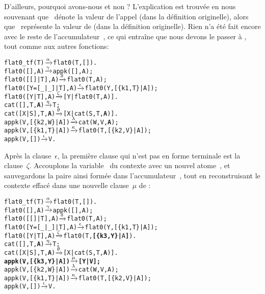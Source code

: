 D'ailleurs, pourquoi avons-nous  et non
?  L'explication est trouvée en nous souvenant que
~dénote la valeur de l'appel  (dans la
définition originelle), alors que ~représente la valeur de
 (dans la définition originelle). Rien n'a été fait
encore avec le reste de l'accumulateur~, ce qui entraîne
que nous devons le passer à , tout comme aux autres
fonctions:
\begin{alltt}
flat0\_tf(T)          \(\smashedrightarrow{\alpha}\) flat0(T,[]).
flat0(         [],A) \(\smashedrightarrow{\gamma}\) appk([],A);
flat0(     [[]|T],A) \(\smashedrightarrow{\delta}\) flat0(T,A);
flat0([Y=[\_|\_]|T],A) \(\smashedrightarrow{\epsilon}\) flat0(Y,[\{k1,T\}|A]);
flat0(      [Y|T],A) \(\smashedrightarrow{\zeta}\) [Y|flat0(T,A)].
cat(   [],T,\textbf{A})       \(\smashedrightarrow{\eta}\) T;\hfill% A \emph{inutile pour le moment}
cat([X|S],T,\textbf{A})       \(\smashedrightarrow{\theta}\) [X|cat(S,T,\textbf{A})].
appk(V,[\{k2,W\}|A])   \(\smashedrightarrow{\lambda}\) cat(W,V,\textbf{A});\hfill% A \emph{transmis}
appk(V,[\{k1,T\}|A])   \(\smashedrightarrow{\kappa}\) flat0(T,[\{k2,V\}|A]);
appk(V,        [])   \(\smashedrightarrow{\iota}\) V.
\end{alltt}
Après la clause~\(\epsilon\), la première clause qui n'est pas en
forme terminale est la clause~\(\zeta\). Accouplons la
variable~ du contexte \erlcode{[Y|\textvisiblespace]} avec
un nouvel atome~, et sauvegardons la paire ainsi formée
dans l'accumulateur~, tout en reconstruisant le contexte effacé dans
une nouvelle clause~\(\mu\) de :
\begin{alltt}
flat0\_tf(T)          \(\smashedrightarrow{\alpha}\) flat0(T,[]).
flat0(         [],A) \(\smashedrightarrow{\gamma}\) appk([],A);
flat0(     [[]|T],A) \(\smashedrightarrow{\delta}\) flat0(T,A);
flat0([Y=[\_|\_]|T],A) \(\smashedrightarrow{\epsilon}\) flat0(Y,[\{k1,T\}|A]);
flat0(      [Y|T],A) \(\smashedrightarrow{\zeta}\) flat0(T,\textbf{[\{k3,Y\}|}A\textbf{]}).\hfill% \emph{Empilage de} Y
cat(   [],T,\textbf{A})       \(\smashedrightarrow{\eta}\) T;\hfill% A \emph{inutile pour le moment}
cat([X|S],T,\textbf{A})       \(\smashedrightarrow{\theta}\) [X|cat(S,T,\textbf{A})].
\textbf{appk(V,[\{k3,Y\}|A])   \(\smashedrightarrow{\mu}\) [Y|V];}\hfill% A \emph{inutile pour le moment}
appk(V,[\{k2,W\}|A])   \(\smashedrightarrow{\lambda}\) cat(W,V,A);
appk(V,[\{k1,T\}|A])   \(\smashedrightarrow{\kappa}\) flat0(T,[\{k2,V\}|A]);
appk(V,        [])   \(\smashedrightarrow{\iota}\) V.
\end{alltt}
